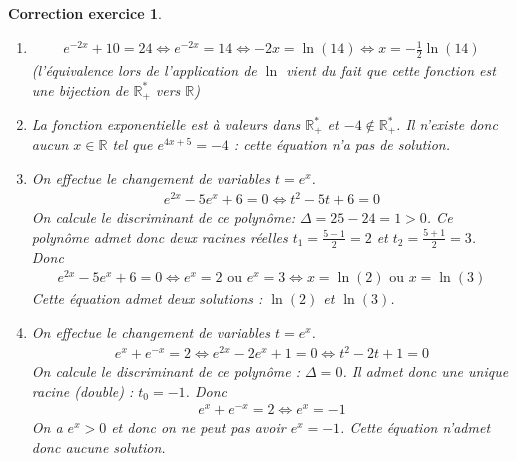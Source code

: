 \documentclass[12pt]{article}
\newtheorem{correction}{\bf Correction exercice}
\newenvironment{cor}{
\begin{correction}\smallskip\normalfont}{\end{correction}
}
\newcommand*{\R}{\mathbb{R}}
\begin{document}
\begin{cor}
\begin{enumerate}
\item
  \begin{align*}
    e^{-2x} + 10 = 24
    \iff
    e^{-2x} = 14
    \iff
    -2x = \ln(14)
    \iff
    x = - \frac12 \ln(14)
  \end{align*}
  (l'\'equivalence lors de l'application de $\ln$ vient du fait que cette fonction
  est une bijection de $\R_+^*$ vers $\R$)

\item La fonction exponentielle est \`a valeurs dans $\R_+^*$ et $-4 \notin \R_+^*$.
  Il n'existe donc aucun $x \in \R$ tel que $e^{4x+5} = -4$ : cette \'equation n'a pas de solution.

\item On effectue le changement de variables $t = e^x$.
  \begin{align*}
    e^{2x} - 5 e^{x} + 6 = 0
    \iff
    t^2 - 5 t + 6 = 0
  \end{align*}
  On calcule le discriminant de ce polyn\^ome:
  $\Delta = 25 - 24 = 1 > 0$.
  Ce polyn\^ome admet donc deux racines r\'eelles
  $t_1 = \frac{5-1}{2} = 2$ et $t_2 = \frac{5+1}{2} = 3$.
  Donc 
  \begin{align*}
    e^{2x} - 5 e^{x} + 6 = 0
    \iff
    e^x = 2 \text{  ou  } e^x = 3
    \iff
    x = \ln(2) \text{  ou  } x = \ln(3)
  \end{align*}
  Cette \'equation admet deux solutions : $\ln(2)$ et $\ln(3)$.
\item On effectue le changement de variables $t = e^x$.
  \begin{align*}
    e^x + e^{-x} = 2
    \iff
    e^{2x} - 2 e^x + 1 = 0
    \iff
    t^2 - 2 t + 1 = 0
  \end{align*}
  On calcule le discriminant de ce polyn\^ome :
  $\Delta = 0$. Il admet donc une unique racine (double) : $t_0 = -1$.
  Donc
  \begin{align*}
    e^x + e^{-x} = 2
    \iff
    e^x = -1
  \end{align*}
  On a $e^x > 0$ et donc on ne peut pas avoir $e^x = -1$.
  Cette \'equation n'admet donc aucune solution.
\end{enumerate}
\end{cor}
\color{black}
\fi

\end{document}
